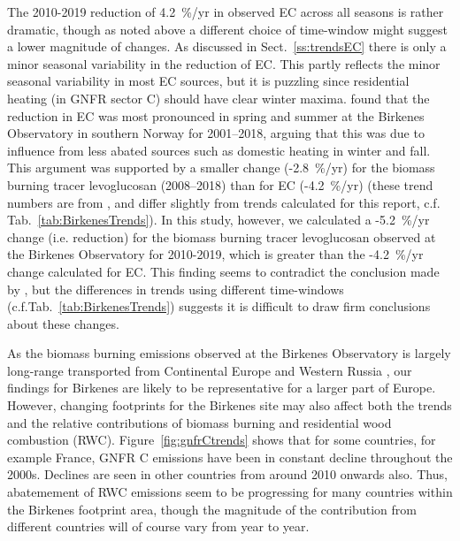 The 2010-2019 reduction of 4.2~\%/yr in observed EC across all seasons is rather dramatic, though as noted above a different choice of time-window might suggest a lower magnitude of changes. 
As discussed in Sect.~\ref{ss:trendsEC} there is only a minor seasonal variability in the reduction of EC. This partly reflects the minor seasonal variability in most EC sources, but it is puzzling since residential heating (in GNFR sector C) should have clear winter maxima. \citet{Yttri2021} found that the reduction in EC
was most pronounced in spring and summer at the Birkenes Observatory in
southern Norway for 2001--2018, arguing that this was due to influence
from less abated sources such as domestic heating in winter and fall. This argument was
supported by a smaller change (-2.8~\%/yr) for the biomass burning
tracer levoglucosan (2008--2018) than for EC (-4.2~\%/yr) (these trend numbers are from \citeauthor{Yttri2021}, and differ slightly from trends calculated for this report, c.f. Tab.~\ref{tab:BirkenesTrends}). In this study, however, 
we calculated a -5.2~\%/yr change (i.e. reduction) for the biomass burning tracer
levoglucosan observed at the Birkenes Observatory for 2010-2019, which is
greater than the -4.2~\%/yr change calculated for EC.
This finding seems to contradict the conclusion made
by \citet{Yttri2021}, but the differences in trends using different time-windows (c.f.Tab.~\ref{tab:BirkenesTrends}) suggests it is difficult to draw firm conclusions about these changes.


As the biomass burning emissions observed at the
Birkenes Observatory is largely long-range transported from Continental
Europe and Western Russia \citep{Yttri2021}, our findings for Birkenes
are likely to be representative for a larger part of Europe. However,
changing footprints  for the Birkenes site may also affect both the trends and
the relative contributions of biomass burning and residential wood combustion (RWC).
Figure~\ref{fig:gnfrCtrends} shows that for some countries, for example France, GNFR C \pmfine emissions have been in constant decline throughout the 2000s. Declines are seen in other countries from around 2010 onwards also. Thus, abatemement of RWC emissions seem to be progressing for many countries within the Birkenes footprint area, though the magnitude of the contribution from different countries will of course vary from year to year.

